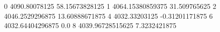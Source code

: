 0 4090.80078125 58.15673828125
1 4064.15380859375 31.509765625
2 4046.2529296875 13.60888671875
4 4032.33203125 -0.31201171875
6 4032.64404296875 0.0
8 4039.96728515625 7.3232421875
